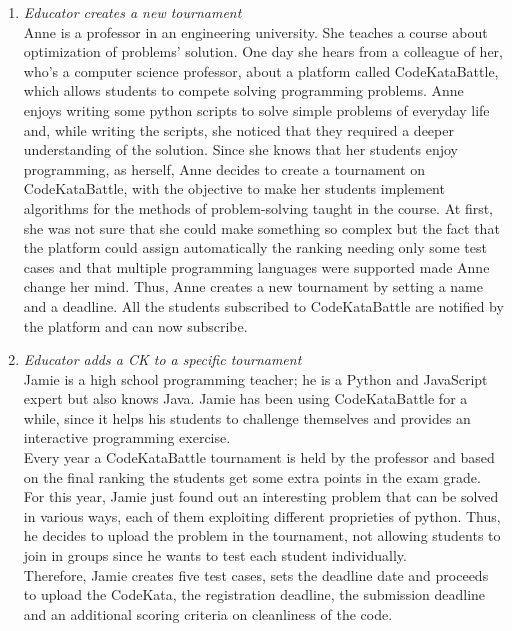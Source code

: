 \documentclass[12pt, a4paper]{report}
\begin{document}
\begin{enumerate}
        \item \textit{Educator creates a new tournament} \\
            Anne is a professor in an engineering university.
            She teaches a course about optimization of problems' solution.
            One day she hears from a colleague of her, who's a computer science professor, about a platform called CodeKataBattle, which allows students to compete solving programming problems.
            Anne enjoys writing some python scripts to solve simple problems of everyday life and, while writing the scripts, she noticed that they required a deeper understanding of the solution.
            Since she knows that her students enjoy programming, as herself, Anne decides to create a tournament on CodeKataBattle, with the objective to make her students implement algorithms for the methods of problem-solving taught in the course.
            At first, she was not sure that she could make something so complex but the fact that the platform could assign automatically the ranking needing only some test cases and that multiple programming languages were supported made Anne change her mind.
            Thus, Anne creates a new tournament by setting a name and a deadline. All the students subscribed to CodeKataBattle are notified by the platform and can now subscribe.
        \item \textit{Educator adds a CK to a specific tournament} \\
            Jamie is a high school programming teacher; he is a Python and JavaScript expert but also knows Java.
            Jamie has been using CodeKataBattle for a while, since it helps his students to challenge themselves and provides an interactive programming exercise.\\
            Every year a CodeKataBattle tournament is held by the professor and based on the final ranking the students get some extra points in the exam grade.\\ 
            For this year, Jamie just found out an interesting problem that can be solved in various ways, each of them exploiting different proprieties of python.
            Thus, he decides to upload the problem in the tournament, not allowing students to join in groups since he wants to test each student individually.\\
            Therefore, Jamie creates five test cases, sets the deadline date and proceeds to upload the CodeKata, the registration deadline, the submission deadline and an additional scoring criteria on cleanliness of the code.

\end{enumerate}
\end{document}
